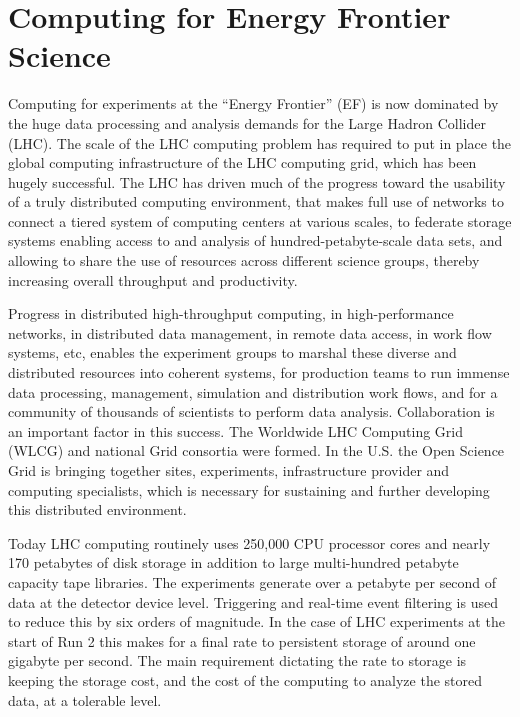 
\section{Computing for Energy Frontier Science}

Computing for experiments at the ``Energy Frontier'' (EF) is now dominated by the huge data
processing and analysis demands for the Large Hadron Collider (LHC). The scale
of the LHC computing problem has required to put in place the global computing
infrastructure of the LHC computing grid, which has been hugely successful. 
The LHC
has driven much of the progress toward the usability of a truly distributed
computing environment, that makes full use of networks to connect a tiered
system of computing centers at various scales, to federate storage systems
enabling access to and analysis of hundred-petabyte-scale data sets, and
allowing to share the use of resources across different science groups, thereby
increasing overall throughput and productivity. 

Progress in distributed high-throughput computing, in high-performance
networks, in distributed data management, in remote data access, in work flow
systems, etc, enables the experiment groups to marshal these diverse
and distributed resources into coherent systems, for production teams to run
immense data processing, management, simulation and distribution work flows,
and for a community of thousands of scientists to perform data analysis.
Collaboration is an important factor in this success. The Worldwide LHC
Computing Grid (WLCG)  and national Grid consortia were formed. In the U.S.
the Open Science Grid is  bringing together sites, experiments, infrastructure
provider and computing specialists, which is necessary for 
sustaining and further developing this distributed environment.

Today LHC computing routinely uses 250,000 CPU processor cores and nearly 170
petabytes of disk storage in addition to large multi-hundred petabyte capacity
tape libraries.  The experiments generate over a petabyte per second of data
at the detector device level. Triggering and real-time event filtering  is
used to reduce this by six orders of magnitude. In the case of LHC experiments
at the start of Run 2 this makes for a final rate to persistent storage of
around one gigabyte per second. The main requirement dictating the rate to
storage is keeping the storage cost, and the  cost of the computing to analyze
the stored data, at a tolerable level.

